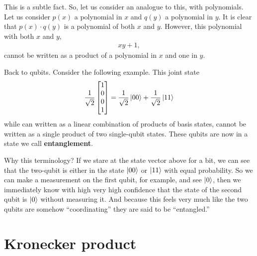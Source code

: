 \documentclass[a4paper,11pt]{article}
\numberwithin{equation}{section}
\theoremstyle{definition}
\newcommand{\f}[2]{\frac{#1}{#2}}
\begin{document}
This is a subtle fact. So, let us consider an analogue to this, with polynomials. Let us consider $p(x)$ a polynomial in $x$ and $q(y)$ a polynomial in $y$. It is clear that $p(x)\cdot q(y)$ is a polynomial of both $x$ and $y$. However, this polynomial with both $x$ and $y$,
\begin{align*}
xy + 1,
\end{align*}
cannot be written as a product of a polynomial in $x$ and one in $y$. 

Back to qubits. Consider the following example. This joint state
\begin{align*}
\frac{1}{\sqrt{2}}\begin{bmatrix}
1\\0\\0\\1
\end{bmatrix} = \f{1}{\sqrt{2}}\ket{00} + \f{1}{\sqrt{2}}\ket{11}
\end{align*}
while can written as a linear combination of products of basis states, cannot be written as a single product of two single-qubit states. These qubits are now in a state we call \textbf{entanglement}. 

Why this terminology? If we stare at the state vector above for a bit, we can see that the two-qubit is either in the state $\left\vert{00}\right\rangle$ or $\left\vert{11}\right\rangle$ with equal probability. So we can make a measurement on the first qubit, for example, and see $\left\vert{0}\right\rangle$, then we immediately know with high very high confidence that the state of the second qubit is $\left\vert{0}\right\rangle$ without measuring it. And because this feels very much like the two qubits are somehow ``coordinating'' they are said to be ``entangled.''

\section{Kronecker product}
\end{document}
